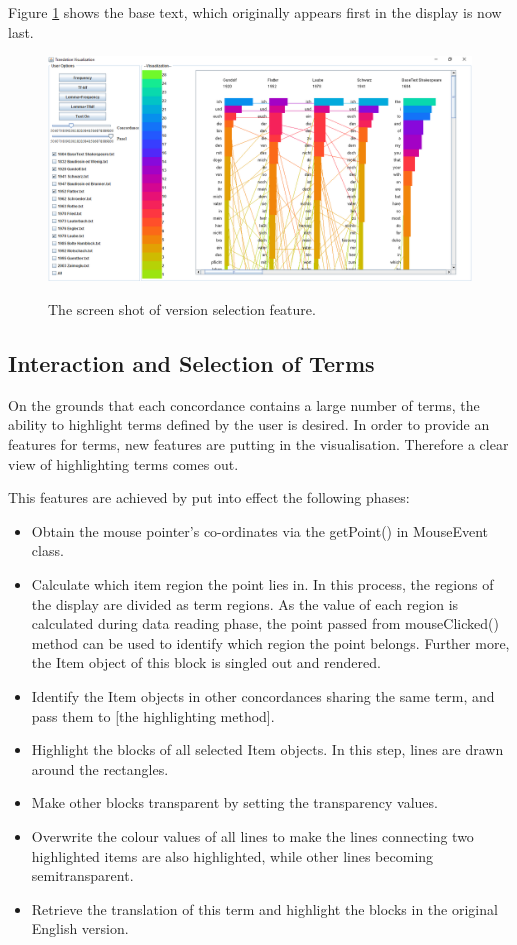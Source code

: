 Figure \ref{fig:versionChoosDemo} shows the base text, which originally appears first in the display is now last.

\begin{figure}[H]
	\centering	
	\includegraphics[scale=0.5]{Figs/Version-Selecting-Demo}\\[1ex]
	\caption{The screen shot of version selection feature.}
	\label{fig:versionChoosDemo}
\end{figure} 

\subsection{Interaction and Selection of Terms}

On the grounds that each concordance contains a large number of terms, the ability to highlight terms defined by the user is desired.  In order to provide an features for terms, new features are putting in the visualisation. Therefore a clear view of highlighting terms comes out. 

This features are achieved by put into effect the following phases:
\begin{itemize}
	\item \textbf{} Obtain the mouse pointer’s co-ordinates via the getPoint() in MouseEvent class.
	\item \textbf{} Calculate which item region the point lies in. In this process, the regions of the display are divided as term regions. As the value of each region is calculated during data reading phase, the point passed from mouseClicked() method can be used to identify which region the point belongs. Further more, the Item object of this block is singled out and rendered. 
	\item \textbf{} Identify the Item objects in other concordances sharing the same term, and pass them to [the highlighting method].
	\item \textbf{} Highlight the blocks of all selected Item objects. In this step, lines are drawn around the rectangles. 
	\item \textbf{} Make other blocks transparent by setting the transparency values. 
	\item \textbf{} Overwrite the colour values of all lines to make the lines connecting two highlighted items are also highlighted, while other lines becoming semitransparent.
	\item \textbf{} Retrieve the translation of this term and highlight the blocks in the original English version.	
\end{itemize}

